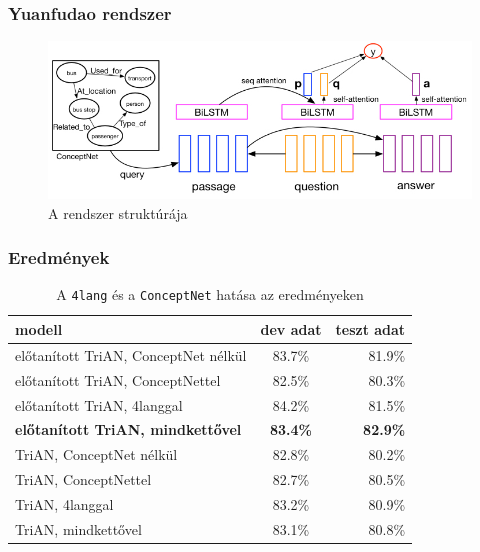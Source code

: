 \documentclass[bigger]{beamer}
\begin{document}


\begin{frame}
	\frametitle{Yuanfudao rendszer}
	\begin{figure}[h!]
		\centering
		\includegraphics[scale=0.4]{pics/TriAN.jpg}
		\caption{A rendszer strukt\'ur\'aja}
		\label{fig:dnn}
	\end{figure}
\end{frame}


\begin{frame}
	\frametitle{Eredm\'enyek}
	\begin{table}[h!]
		\centering
		\begin{tabular}{ | l | c | r | }
			\hline
			modell & dev adat & teszt adat \\ \hline \hline
			 el\H{o}tan\'itott TriAN, ConceptNet n\'elk\"ul & 83.7\% & 81.9\%  \\ \hline
			el\H{o}tan\'itott TriAN, ConceptNettel & 82.5\% & 80.3\%  \\ \hline
			el\H{o}tan\'itott TriAN, 4langgal & 84.2\% & 81.5\% \\ \hline
			\textbf{el\H{o}tan\'itott TriAN, mindkett\H{o}vel} & \textbf{83.4\%} & \textbf{82.9\%} \\ \hline
			TriAN, ConceptNet n\'elk\"ul & 82.8\% & 80.2\% \\ \hline
			TriAN, ConceptNettel & 82.7\% & 80.5\% \\ \hline
			TriAN, 4langgal & 83.2\% & 80.9\%  \\ \hline
			TriAN, mindkett\H{o}vel & 83.1\% & 80.8\% \\ \hline
		\end{tabular}
		\caption{A \texttt{4lang} \'es a \texttt{ConceptNet} hat\'asa az eredm\'enyeken}
		\label{tabl:res}
	\end{table}
\end{frame}
\end{document}

